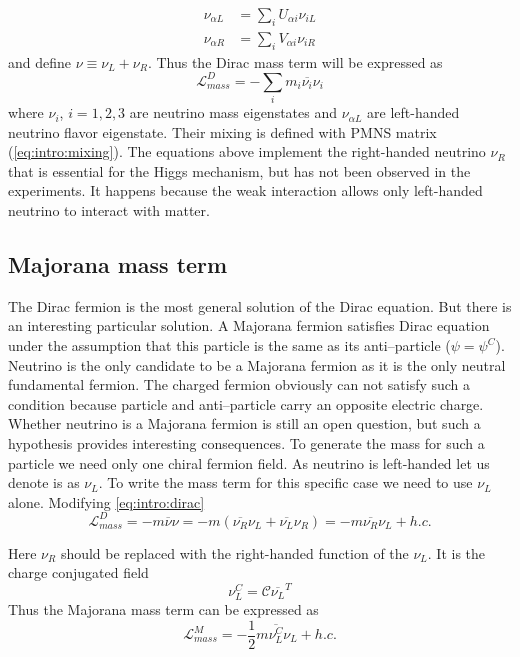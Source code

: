 \documentclass[../main.tex]{subfiles}
\begin{document}
\begin{align}
\nu_{\alpha L}&=\sum_iU_{\alpha i}\nu_{iL} \nonumber \\
\nu_{\alpha R}&=\sum_iV_{\alpha i}\nu_{iR}
\end{align}
and define $\nu\equiv\nu_L+\nu_R$. Thus the Dirac mass term will be expressed as
\begin{equation}
\label{eq:intro:dirac}
\mathcal{L}^{D}_{mass}=-\sum_im_i\overline{\nu_i}\nu_i
\end{equation}
where $\nu_i$, $i=1, 2, 3$ are neutrino mass eigenstates and $\nu_{\alpha L}$ are left-handed neutrino flavor eigenstate. Their mixing is defined with PMNS matrix (\autoref{eq:intro:mixing}). The equations above implement the right-handed neutrino $\nu_R$ that is essential for the Higgs mechanism, but has not been observed in the experiments. It happens because the weak interaction allows only left-handed neutrino to interact with matter.

\subsection{Majorana mass term}
The Dirac fermion is the most general solution of the Dirac equation. But there is an interesting particular solution. A Majorana fermion satisfies Dirac equation under the assumption that this particle is the same as its anti--particle ($\psi=\psi^C$). Neutrino is the only candidate to be a Majorana fermion as it is the only neutral fundamental fermion. The charged fermion obviously can not satisfy such a condition because particle and anti--particle carry an opposite electric charge. Whether neutrino is a Majorana fermion is still an open question, but such a hypothesis provides interesting consequences. To generate the mass for such a particle we need only one chiral fermion field. As neutrino is left-handed let us denote is as $\nu_L$. To write the mass term for this specific case we need to use $\nu_L$ alone. Modifying \autoref{eq:intro:dirac}
\begin{equation}
\mathcal{L}^D_{mass}=-m\overline{\nu}\nu=-m\left(\overline{\nu_R}\nu_L+\overline{\nu_L}\nu_R\right)=-m\overline{\nu_R}\nu_L+h.c.
\end{equation}

Here $\nu_R$ should be replaced with the right-handed function of the $\nu_L$. It is the charge conjugated field
\begin{equation}
\nu_L^C=\mathcal{C}\overline{\nu_L}^T
\end{equation}
Thus the Majorana mass term can be expressed as
\begin{equation}
\mathcal{L}^M_{mass}=-\frac{1}{2}m\overline{\nu_L^C}\nu_L+h.c.
\end{equation}
\end{document}
